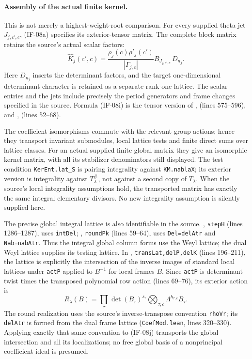 \documentclass[11pt,a4paper]{article}
\theoremstyle{definition}
\theoremstyle{remark}
\begin{document}
\paragraph{Assembly of the actual finite kernel.}
This is not merely a highest-weight-root comparison. For every
supplied theta jet $J_{j,c',c}$, (IF-08a) specifies its exterior-tensor
matrix. The complete block matrix retains the source's actual scalar
factors:
\[
 \widehat K_j(c',c)=\frac{\rho_j(c)\rho'_j(c')}{|\Gamma_{j,c}|}
        B_{J_{j,c',c}}\,D_{n_j}.                  \tag{IF-08i}
\]
Here $D_{n_j}$ inserts the determinant factors, and the target
one-dimensional determinant character is retained as a separate
rank-one lattice. The scalar entries and the jets include precisely
the period generators and frame changes specified in the source.
Formula (IF-08i) is the tensor version of
,
 (lines 575--596), and
,
 (lines 52--68).

The coefficient isomorphisms commute with the relevant group actions;
hence they transport invariant submodules, local lattice tests and
finite direct sums over lattice classes. For an actual supplied
finite global matrix they give an isomorphic kernel matrix, with all
its stabilizer denominators still displayed. The test condition
\texttt{KerEnt.lat\_S} is pairing integrality against
\texttt{KM.nablaX}; its exterior version is integrality against
$T_\lambda^\#$, not against a second copy of $T_\lambda$.
When the source's local integrality assumptions hold, the transported
matrix has exactly the same integral elementary divisors. No new
integrality assumption is silently supplied here.

The precise global integral lattice is also identifiable in the source.
, \texttt{stepH} (lines 1286--1287),
uses \texttt{intDel}; ,
\texttt{roundPk} (lines 59--64), uses \texttt{Del=delAtr} and
\texttt{Nab=nabAtr}. Thus the integral global column forms use the
Weyl lattice; the dual Weyl lattice supplies its testing lattice.
In ,
\texttt{transLat,delP,delK} (lines 196--211), the lattice is explicitly
the intersection of the inverse images of standard local lattices
under \texttt{actP} applied to $B^{-1}$ for local frames $B$.
Since \texttt{actP} is determinant twist times the transposed
polynomial row action (lines 69--76), its exterior action is
\[
 R_\lambda(B)=\prod_\tau\det(B_\tau)^{s_\tau}
       \bigotimes_{\tau,c}\Lambda^{h_{\tau,c}}B_\tau.
                                                               \tag{IF-08j}
\]
The round realization uses the source's inverse-transpose convention
\texttt{rhoVr}; its \texttt{delAtr} is formed from the dual frame
lattice (\texttt{CoefMod.lean}, lines 320--330). Applying exactly that
same convention to (IF-08j) transports the global intersection and
all its localizations; no free global basis of a nonprincipal
coefficient ideal is presumed.
\end{document}
